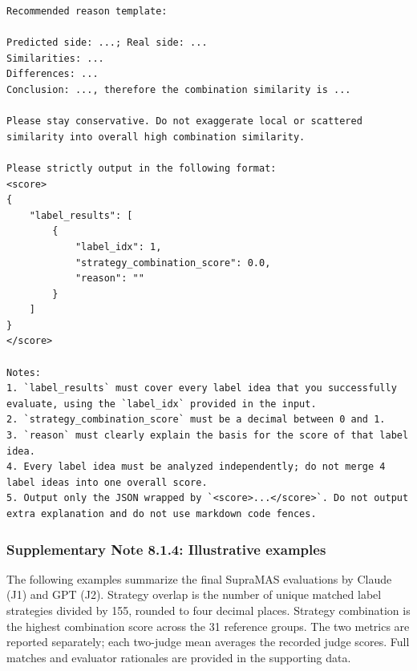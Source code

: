 \begin{lstlisting}[style=jsonstyle]
Recommended reason template:

Predicted side: ...; Real side: ...
Similarities: ...
Differences: ...
Conclusion: ..., therefore the combination similarity is ...

Please stay conservative. Do not exaggerate local or scattered similarity into overall high combination similarity.

Please strictly output in the following format:
<score>
{
    "label_results": [
        {
            "label_idx": 1,
            "strategy_combination_score": 0.0,
            "reason": ""
        }
    ]
}
</score>

Notes:
1. `label_results` must cover every label idea that you successfully evaluate, using the `label_idx` provided in the input.
2. `strategy_combination_score` must be a decimal between 0 and 1.
3. `reason` must clearly explain the basis for the score of that label idea.
4. Every label idea must be analyzed independently; do not merge 4 label ideas into one overall score.
5. Output only the JSON wrapped by `<score>...</score>`. Do not output extra explanation and do not use markdown code fences.
\end{lstlisting}

\subsubsection*{Supplementary Note 8.1.4: Illustrative examples}
{}
The following examples summarize the final SupraMAS evaluations by Claude (J1) and GPT (J2). Strategy overlap is the number of unique matched label strategies divided by 155, rounded to four decimal places. Strategy combination is the highest combination score across the 31 reference groups. The two metrics are reported separately; each two-judge mean averages the recorded judge scores. Full matches and evaluator rationales are provided in the supporting data.

